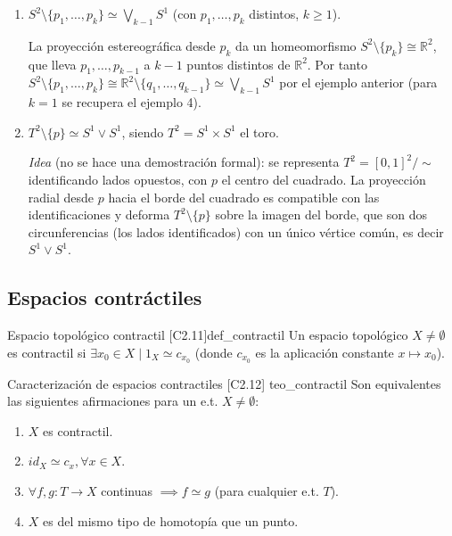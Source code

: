 \begin{enumerate}
    \item $S^2 \setminus \{p_1, \dots, p_k\} \simeq \bigvee_{k-1} S^1$ (con $p_1, \dots, p_k$ distintos, $k \ge 1$).

    La proyección estereográfica desde $p_k$ da un homeomorfismo $S^2 \setminus \{p_k\} \cong \mathbb{R}^2$, que lleva $p_1, \dots, p_{k-1}$ a $k-1$ puntos distintos de $\mathbb{R}^2$. Por tanto $S^2 \setminus \{p_1, \dots, p_k\} \cong \mathbb{R}^2 \setminus \{q_1, \dots, q_{k-1}\} \simeq \bigvee_{k-1} S^1$ por el ejemplo anterior (para $k=1$ se recupera el ejemplo 4).

    \item $T^2 \setminus \{p\} \simeq S^1 \vee S^1$, siendo $T^2 = S^1 \times S^1$ el toro.

    \emph{Idea} (no se hace una demostración formal): se representa $T^2 = [0,1]^2/\!\sim$ identificando lados opuestos, con $p$ el centro del cuadrado. La proyección radial desde $p$ hacia el borde del cuadrado es compatible con las identificaciones y deforma $T^2 \setminus \{p\}$ sobre la imagen del borde, que son dos circunferencias (los lados identificados) con un único vértice común, es decir $S^1 \vee S^1$.
\end{enumerate}


\subsection{Espacios contráctiles}

\begin{definicion}{Espacio topológico contractil [C2.11]}{def_contractil}
Un espacio topológico $X \neq \emptyset$ es contractil si $\exists x_0 \in X \mid 1_X \simeq c_{x_0}$ (donde $c_{x_0}$ es la aplicación constante $x \mapsto x_0$).
\end{definicion}

\begin{teorema}{Caracterización de espacios contractiles [C2.12] \marcaE}{teo_contractil}
Son equivalentes las siguientes afirmaciones para un e.t. $X \neq \emptyset$:
\begin{enumerate}
    \item[a)] $X$ es contractil.
    \item[b)] $id_X \simeq c_x, \forall x \in X$.
    \item[c)] $\forall f,g \colon T \to X$ continuas $\implies f \simeq g$ (para cualquier e.t. $T$).
    \item[d)] $X$ es del mismo tipo de homotopía que un punto.
\end{enumerate}
\end{teorema}

